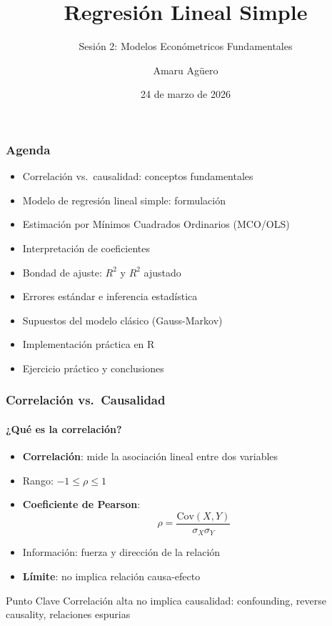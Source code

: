 \documentclass[aspectratio=169,11pt]{beamer}
\institute[CICS — UDD]{Doctorado en Ciencias de la Complejidad Social — CICS, UDD}
\title{Regresión Lineal Simple}
\subtitle{Sesión 2: Modelos Económetricos Fundamentales}
\author[A. Agüero]{Amaru Agüero}
\date{24 de marzo de 2026}
\begin{document}
\begin{frame}[plain]
\titlepage
\end{frame}

\begin{frame}
\frametitle{Agenda}
\setlength{\itemsep}{6pt}
\begin{itemize}
    \item Correlación vs.\ causalidad: conceptos fundamentales
    \item Modelo de regresión lineal simple: formulación
    \item Estimación por Mínimos Cuadrados Ordinarios (MCO/OLS)
    \item Interpretación de coeficientes
    \item Bondad de ajuste: $R^2$ y $R^2$ ajustado
    \item Errores estándar e inferencia estadística
    \item Supuestos del modelo clásico (Gauss-Markov)
    \item Implementación práctica en R
    \item Ejercicio práctico y conclusiones
\end{itemize}
\end{frame}

\begin{frame}
\frametitle{Correlación vs.\ Causalidad}
\framesubtitle{¿Qué es la correlación?}

\small
\setlength{\itemsep}{2pt}
\begin{itemize}
    \item \textbf{Correlación}: mide la asociación lineal entre dos variables
    \item Rango: $-1 \leq \rho \leq 1$
    \item \textbf{Coeficiente de Pearson}:
    $$\rho = \frac{\text{Cov}(X, Y)}{\sigma_X \sigma_Y}$$
    \item Información: fuerza y dirección de la relación
    \item \textbf{Límite}: no implica relación causa-efecto
\end{itemize}

\vspace{0.3cm}
\begin{alertblock}{Punto Clave}
    \vspace{-0.2cm}
    Correlación alta no implica causalidad: confounding, reverse causality, relaciones espurias
    \vspace{-0.15cm}
\end{alertblock}
\end{frame}
\end{document}
